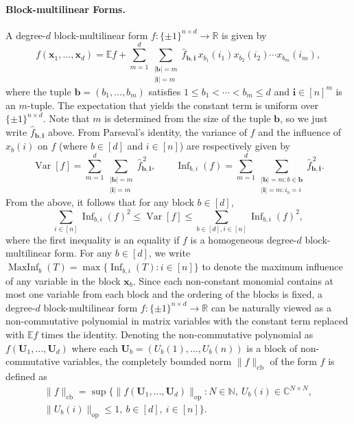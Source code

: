 \documentclass[10pt,a4paper]{article}
\begin{document}
\paragraph{Block-multilinear Forms.}
A degree-$d$ block-multilinear form $f:\{\pm1\}^{n\times d}\to\mathbb R$ is given by
\[f(\mathbf x_1,\ldots,\mathbf x_d)=\mathbb Ef+\sum_{m=1}^d\sum_{\substack{|\mathbf b|=m\\|\mathbf i|=m}}\widehat f_{\mathbf b,\mathbf i}\,x_{b_1}(i_1)x_{b_2}(i_2)\cdots x_{b_m}(i_m),\tag{6}\]
where the tuple $\mathbf b=(b_1,\ldots,b_m)$ satisfies $1\leq b_1<\cdots<b_m\leq d$ and $\mathbf i\in[n]^m$ is an $m$-tuple. The expectation that yields the constant term is uniform over $\{\pm1\}^{n\times d}$. Note that $m$ is determined from the size of the tuple $\mathbf b$, so we just write $\widehat f_{\mathbf b,\mathbf i}$ above.
From Parseval's identity, the variance of $f$ and the influence of $x_b(i)$ on $f$ (where $b\in[d]$ and $i\in[n]$) are respectively given by
\[\operatorname{Var}[f]=\sum_{m=1}^d\sum_{\substack{|\mathbf b|=m\\|\mathbf i|=m}}\widehat f_{\mathbf b,\mathbf i}^{\,2},\qquad\operatorname{Inf}_{b,i}(f)=\sum_{m=1}^d\sum_{\substack{|\mathbf b|=m:b\in\mathbf b\\|\mathbf i|=m:i_b=i}}\widehat f_{\mathbf b,\mathbf i}^{\,2}.\]
From the above, it follows that for any block $b\in[d]$,
\[\sum_{i\in[n]}\operatorname{Inf}_{b,i}(f)^2\leq\operatorname{Var}[f]\leq\sum_{b\in[d],i\in[n]}\operatorname{Inf}_{b,i}(f)^2,\tag{7}\]
where the first inequality is an equality if $f$ is a homogeneous degree-$d$ block-multilinear form. For any $b\in[d]$, we write $\operatorname{MaxInf}_b(T)=\max\{\operatorname{Inf}_{b,i}(T):i\in[n]\}$ to denote the maximum influence of any variable in the block $\mathbf x_b$.
Since each non-constant monomial contains at most one variable from each block and the ordering of the blocks is fixed, a degree-$d$ block-multilinear form $f:\{\pm1\}^{n\times d}\to\mathbb R$ can be naturally viewed as a non-commutative polynomial in matrix variables with the constant term replaced with $\mathbb Ef$ times the identity. Denoting the non-commutative polynomial as $f(\mathbf U_1,\ldots,\mathbf U_d)$ where each $\mathbf U_b=(U_b(1),\ldots,U_b(n))$ is a block of non-commutative variables, the completely bounded norm $\|f\|_{\mathrm{cb}}$ of the form $f$ is defined as
\begin{multline*}
\|f\|_{\mathrm{cb}}=\sup\{\|f(\mathbf U_1,\ldots,\mathbf U_d)\|_{\mathrm{op}}:N\in\mathbb N,\ U_b(i)\in\mathbb C^{N\times N},\\
\|U_b(i)\|_{\mathrm{op}}\leq1,\ b\in[d],\ i\in[n]\}.
\end{multline*}
\end{document}
